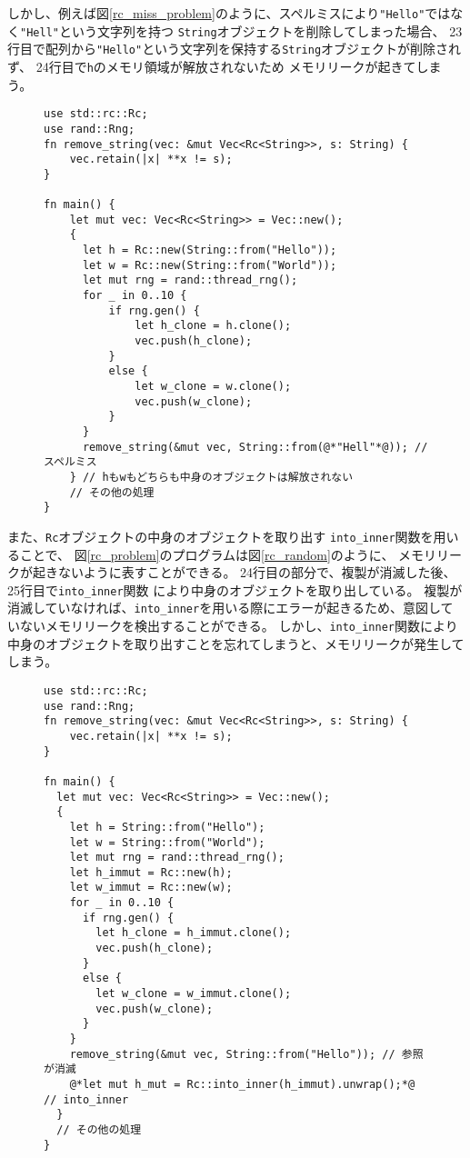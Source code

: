 \documentclass{sumiilab-paper}
\theoremstyle{mystyle}
\numberwithin{definition}{chapter} %
\begin{document}
しかし、例えば図\ref{rc_miss_problem}のように、スペルミスにより\texttt{"Hello"}ではなく\texttt{"Hell"}という文字列を持つ
\texttt{String}オブジェクトを削除してしまった場合、
23行目で配列から\texttt{"Hello"}という文字列を保持する\texttt{String}オブジェクトが削除されず、
24行目で\texttt{h}のメモリ領域が解放されないため
メモリリークが起きてしまう。
\begin{figure}[htp]
\begin{lstlisting}[caption=ユーザのミスによるメモリリーク, 
  label=rc_miss_problem, captionpos=b]
use std::rc::Rc;
use rand::Rng;
fn remove_string(vec: &mut Vec<Rc<String>>, s: String) {
    vec.retain(|x| **x != s);
}
  
fn main() {
    let mut vec: Vec<Rc<String>> = Vec::new();
    {
      let h = Rc::new(String::from("Hello"));
      let w = Rc::new(String::from("World"));
      let mut rng = rand::thread_rng();
      for _ in 0..10 {
          if rng.gen() {
              let h_clone = h.clone();
              vec.push(h_clone);
          }
          else {
              let w_clone = w.clone();
              vec.push(w_clone);
          }
      }
      remove_string(&mut vec, String::from(@*"Hell"*@)); // スペルミス
    } // hもwもどちらも中身のオブジェクトは解放されない
    // その他の処理
}
\end{lstlisting}
\end{figure}

また、\texttt{Rc}オブジェクトの中身のオブジェクトを取り出す
\texttt{into\_inner}関数を用いることで、
図\ref{rc_problem}のプログラムは図\ref{rc_random}のように、
メモリリークが起きないように表すことができる。
24行目の部分で、複製が消滅した後、25行目で\texttt{into\_inner}関数
により中身のオブジェクトを取り出している。
複製が消滅していなければ、\texttt{into\_inner}を用いる際にエラーが起きるため、意図していないメモリリークを検出することができる。
しかし、\texttt{into\_inner}関数により中身のオブジェクトを取り出すことを忘れてしまうと、メモリリークが発生してしまう。
\begin{figure}[htp]
\begin{lstlisting}[caption=into\_inner関数を用いた例, 
  label=rc_random, captionpos=b]
use std::rc::Rc;
use rand::Rng;
fn remove_string(vec: &mut Vec<Rc<String>>, s: String) {
    vec.retain(|x| **x != s);
}

fn main() {
  let mut vec: Vec<Rc<String>> = Vec::new();
  {
    let h = String::from("Hello");
    let w = String::from("World");
    let mut rng = rand::thread_rng();
    let h_immut = Rc::new(h);
    let w_immut = Rc::new(w);
    for _ in 0..10 {
      if rng.gen() {
        let h_clone = h_immut.clone();
        vec.push(h_clone);
      }
      else {
        let w_clone = w_immut.clone();
        vec.push(w_clone);
      }
    }
    remove_string(&mut vec, String::from("Hello")); // 参照が消滅
    @*let mut h_mut = Rc::into_inner(h_immut).unwrap();*@ // into_inner
  }
  // その他の処理
}
\end{lstlisting}
\end{figure}
\end{document}
